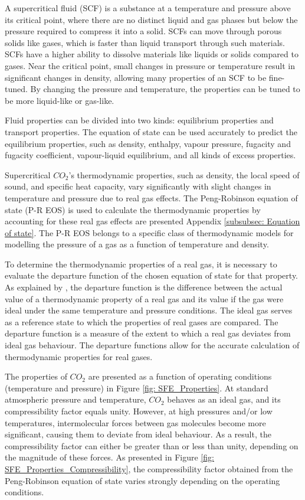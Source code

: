 \documentclass[../Article_Model_Parameters.tex]{subfiles}
\begin{document}
	
	A supercritical fluid (SCF) is a substance at a temperature and pressure above its critical point, where there are no distinct liquid and gas phases but below the pressure required to compress it into a solid. SCFs can move through porous solids like gases, which is faster than liquid transport through such materials. SCFs have a higher ability to dissolve materials like liquids or solids compared to gases. Near the critical point, small changes in pressure or temperature result in significant changes in density, allowing many properties of an SCF to be fine-tuned. By changing the pressure and temperature, the properties can be tuned to be more liquid-like or gas-like.
	
	Fluid properties can be divided into two kinds: equilibrium properties and transport properties. The equation of state can be used accurately to predict the equilibrium properties, such as density, enthalpy, vapour pressure, fugacity and fugacity coefficient, vapour-liquid equilibrium, and all kinds of excess properties.
	
	Supercritical $CO_2$'s thermodynamic properties, such as density, the local speed of sound, and specific heat capacity, vary significantly with slight changes in temperature and pressure due to real gas effects. The Peng-Robinson equation of state (P-R EOS) is used to calculate the thermodynamic properties by accounting for these real gas effects are presented Appendix \ref{subsubsec: Equation of state}. The P-R EOS belongs to a specific class of thermodynamic models for modelling the pressure of a gas as a function of temperature and density.
		
	To determine the thermodynamic properties of a real gas, it is necessary to evaluate the departure function of the chosen equation of state for that property. As explained by \citet{Elliott2011}, the departure function is the difference between the actual value of a thermodynamic property of a real gas and its value if the gas were ideal under the same temperature and pressure conditions. The ideal gas serves as a reference state to which the properties of real gases are compared. The departure function is a measure of the extent to which a real gas deviates from ideal gas behaviour. The departure functions allow for the accurate calculation of thermodynamic properties for real gases. %
	
	The properties of $CO_2$  are presented as a function of operating conditions (temperature and pressure) in Figure \ref{fig: SFE_Properties}. At standard atmospheric pressure and temperature, $CO_2$  behaves as an ideal gas, and its compressibility factor equals unity. However, at high pressures and/or low temperatures, intermolecular forces between gas molecules become more significant, causing them to deviate from ideal behaviour. As a result, the compressibility factor can either be greater than or less than unity, depending on the magnitude of these forces. As presented in Figure \ref{fig: SFE_Properties_Compressibility}, the compressibility factor obtained from the Peng-Robinson equation of state varies strongly depending on the operating conditions. 
		
\end{document}

